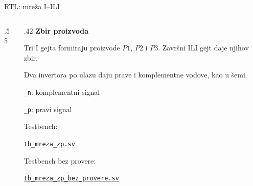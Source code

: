 \begin{frame}[label=02-s021-rtl01]{RTL: mreža I–ILI}
\setlength{\parskip}{0pt}

\begin{columns}[T,onlytextwidth]
\begin{column}{.55\textwidth}

\end{column}
\begin{column}{.42\textwidth}
\fontsize{10}{12}\selectfont
\textbf{Zbir proizvoda}\par\vspace{2mm}
Tri I gejta formiraju proizvode \(P1\), \(P2\) i \(P3\). Završni ILI gejt daje njihov zbir.\par\vspace{2mm}
Dva invertora po ulazu daju prave i komplementne vodove, kao u šemi.\par\vspace{2mm}
\texttt{\_n}: komplementni signal\par
\texttt{\_p}: pravi signal
\par\vspace{2mm}
{\fontsize{9}{11}\selectfont
Testbench:\par
\href{https://github.com/pznikola/digitalna_elektronika_1/blob/main/predavanja/02_sinteza_kombinacionih_mreza/kodovi/primeri_sv/02-s021/tb_mreza_zp.sv}{\texttt{tb\_mreza\_zp.sv}}\par
Testbench bez provere:\par
\href{https://github.com/pznikola/digitalna_elektronika_1/blob/main/predavanja/02_sinteza_kombinacionih_mreza/kodovi/primeri_sv/02-s021/tb_mreza_zp_bez_provere.sv}{\texttt{tb\_mreza\_zp\_bez\_provere.sv}}\par}
\end{column}
\end{columns}
\end{frame}
